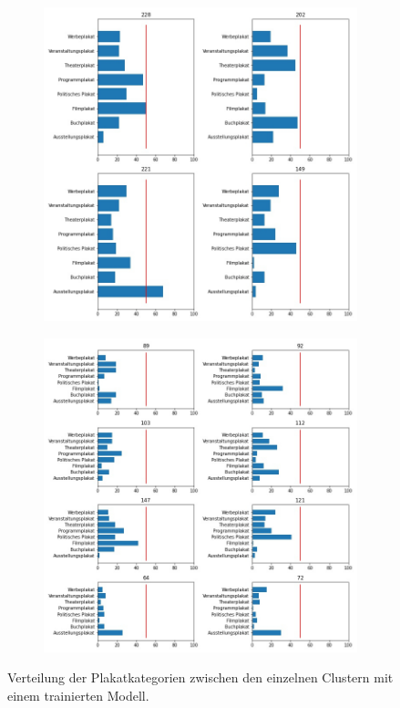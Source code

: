 \documentclass[a4paper,12pt,ngerman]{article}
\begin{document}
\newpage
\begin{landscape}
\begin{figure}[ht]
	\begin{subfigure}[b]{0.5\linewidth}
	\centering
	\includegraphics[height=\linewidth]{4_clusters_trained}
	\end{subfigure}
	\begin{subfigure}[b]{0.5\linewidth}
	\centering
	\includegraphics[height=\linewidth]{8_clusters_trained}
	\end{subfigure}
	\caption{Verteilung der Plakatkategorien zwischen den einzelnen Clustern mit einem trainierten Modell.}
\end{figure}
\end{landscape}
\end{document}
